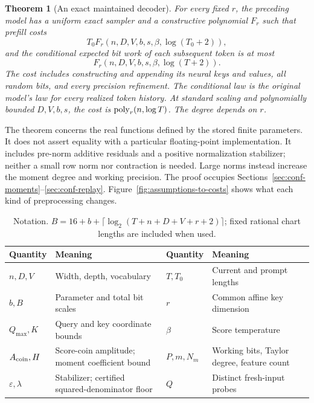 \documentclass[11pt]{article}
\newtheorem{theorem}{Theorem}[section]
\theoremstyle{definition}\newtheorem{definition}[theorem]{Definition}
\theoremstyle{remark}\newtheorem{remark}[theorem]{Remark}
\numberwithin{equation}{section}
\begin{document}
\begin{theorem}[An exact maintained decoder]
\label{thm:conf-decoder}
For every fixed $r$, the preceding model has a uniform exact
sampler and a constructive polynomial $F_r$ such that prefill costs
\[
 T_0F_r(n,D,V,b,s,\beta,\log(T_0+2)),
\]
and the conditional expected bit work of each subsequent token is at most
\[
 F_r(n,D,V,b,s,\beta,\log(T+2)).
\]
The cost includes constructing and appending its neural keys and values,
all random bits, and every precision refinement. The conditional law is
the original model's law for every realized token history. At standard
scaling and polynomially bounded $D,V,b,s$, the cost is
$\operatorname{poly}_r(n,\log T)$. The degree depends on $r$.
\end{theorem}

The theorem concerns the real functions defined by the stored finite
parameters. It does not assert equality with a particular floating-point
implementation. It includes pre-norm additive residuals and a positive
normalization stabilizer; neither a small row norm nor contraction is
needed. Large norms instead increase the moment degree and working
precision. The proof occupies Sections~\ref{sec:conf-moments}--\ref{sec:conf-replay}.
Figure~\ref{fig:assumptions-to-costs} shows what each kind of
preprocessing changes.

\begin{table}[t]\centering\small
\begin{tabularx}{\textwidth}{@{}p{}Y p{.18\textwidth}Y@{}}
\toprule
Quantity & Meaning & Quantity & Meaning\\\midrule
$n,D,V$ & Width, depth, vocabulary & $T,T_0$ & Current and prompt lengths\\
$b,B$ & Parameter and total bit scales & $r$ & Common affine key dimension\\
$Q_{\max},K$ & Query and key coordinate bounds & $\beta$ & Score temperature\\
$A_{\rm coin},H$ & Score-coin amplitude; moment coefficient bound & $P,m,N_m$ & Working bits, Taylor degree, feature count\\
$\varepsilon,\lambda$ & Stabilizer; certified squared-denominator floor & $Q$ & Distinct fresh-input probes\\
\bottomrule
\end{tabularx}
\caption{Notation. $B=16+b+\lceil\log_2(T+n+D+V+r+2)\rceil$;
fixed rational chart lengths are included when used.}
\label{tab:conf-notation}
\end{table}
\end{document}
